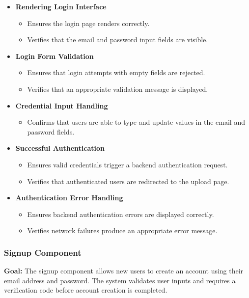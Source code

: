 \documentclass[12pt, titlepage]{article}
\begin{document}
\begin{itemize}

\item \textbf{Rendering Login Interface}
\begin{itemize}
\item Ensures the login page renders correctly.
\item Verifies that the email and password input fields are visible.
\end{itemize}

\item \textbf{Login Form Validation}
\begin{itemize}
\item Ensures that login attempts with empty fields are rejected.
\item Verifies that an appropriate validation message is displayed.
\end{itemize}

\item \textbf{Credential Input Handling}
\begin{itemize}
\item Confirms that users are able to type and update values in the email and password fields.
\end{itemize}

\item \textbf{Successful Authentication}
\begin{itemize}
\item Ensures valid credentials trigger a backend authentication request.
\item Verifies that authenticated users are redirected to the upload page.
\end{itemize}

\item \textbf{Authentication Error Handling}
\begin{itemize}
\item Ensures backend authentication errors are displayed correctly.
\item Verifies network failures produce an appropriate error message.
\end{itemize}

\end{itemize}


\subsubsection{Signup Component}

\textbf{Goal:}
The signup component allows new users to create an account using their email
address and password. The system validates user inputs and requires a
verification code before account creation is completed.
\end{document}
